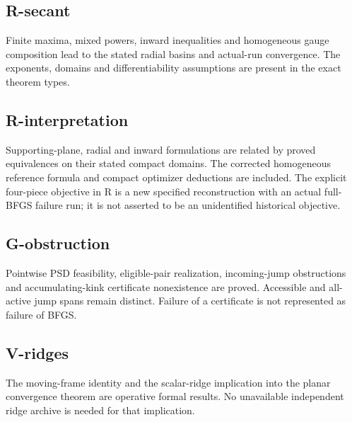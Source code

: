

\subsection{R-secant}\label{r-secant}

Finite maxima, mixed powers, inward inequalities and homogeneous gauge composition lead to the stated radial basins and actual-run convergence. The exponents, domains and differentiability assumptions are present in the exact theorem types.



\subsection{R-interpretation}\label{r-interpretation}

Supporting-plane, radial and inward formulations are related by proved equivalences on their stated compact domains. The corrected homogeneous reference formula and compact optimizer deductions are included. The explicit four-piece objective in R is a new specified reconstruction with an actual full-BFGS failure run; it is not asserted to be an unidentified historical objective.



\subsection{G-obstruction}\label{g-obstruction}

Pointwise PSD feasibility, eligible-pair realization, incoming-jump obstructions and accumulating-kink certificate nonexistence are proved. Accessible and all-active jump spans remain distinct. Failure of a certificate is not represented as failure of BFGS.



\subsection{V-ridges}\label{v-ridges}

The moving-frame identity and the scalar-ridge implication into the planar convergence theorem are operative formal results. No unavailable independent ridge archive is needed for that implication.




